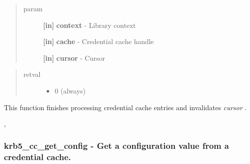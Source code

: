 \documentclass[letterpaper,10pt,english]{sphinxmanual}
\begin{document}
\begin{quote}\begin{description}
\item[{param}] \leavevmode
\textbf{{[}in{]}} \textbf{context} - Library context

\textbf{{[}in{]}} \textbf{cache} - Credential cache handle

\textbf{{[}in{]}} \textbf{cursor} - Cursor

\end{description}\end{quote}
\begin{quote}\begin{description}
\item[{retval}] \leavevmode\begin{itemize}
\item {} 
0   (always)

\end{itemize}

\end{description}\end{quote}

This function finishes processing credential cache entries and invalidates \emph{cursor} .




{\hyperref[appdev/refs/api/krb5_cc_start_seq_get:c.krb5_cc_start_seq_get]{}} , {\hyperref[appdev/refs/api/krb5_cc_next_cred:c.krb5_cc_next_cred]{}}




\subsubsection{krb5\_cc\_get\_config -  Get a configuration value from a credential cache.}
\label{appdev/refs/api/krb5_cc_get_config:krb5-cc-get-config-get-a-configuration-value-from-a-credential-cache}\label{appdev/refs/api/krb5_cc_get_config::doc}

\begin{fulllineitems}
\label{appdev/refs/api/krb5_cc_get_config:c.krb5_cc_get_config}
\end{fulllineitems}
\end{document}
